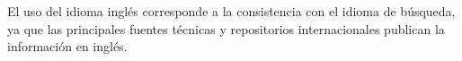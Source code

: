 El uso del idioma inglés corresponde a la consistencia con el idioma de búsqueda, ya que las principales fuentes técnicas y repositorios internacionales publican la información en inglés.
